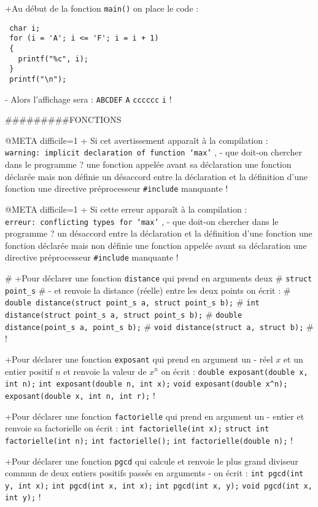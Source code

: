 +Au début de la fonction \verb|main()| on place le code :
 \begin{verbatim}
 char i;
 for (i = 'A'; i <= 'F'; i = i + 1)
 {
   printf("%c", i);
 }
 printf("\n");
\end{verbatim}
- Alors l'affichage sera :
 \verb|ABCDEF|
 \verb|A|
 \verb|cccccc|
 \verb|i|
!



#########FONCTIONS

@META difficile=1
+ Si cet avertissement apparaît à la compilation : \\
 \verb+warning: implicit declaration of function ‘max’+ , 
- que doit-on chercher dans le programme ?
  une fonction appelée avant sa déclaration
  une fonction déclarée mais non définie
  un désaccord entre la déclaration et la définition d'une fonction
  une directive préprocesseur \verb+#include+ manquante
!

@META difficile=1
+ Si cette erreur apparaît à la compilation : \\
  \verb+erreur: conflicting types for ‘max’+ , 
- que doit-on chercher dans le programme ?
  un désaccord entre la déclaration et la définition d'une fonction
  une fonction déclarée mais non définie
  une fonction appelée avant sa déclaration
  une directive préprocesseur \verb+#include+ manquante
!


# +Pour déclarer une fonction \verb|distance| qui prend en arguments deux
# \verb|struct point_s|
# - et renvoie la distance (réelle) entre les deux points on écrit :
#  \verb|double distance(struct point_s a, struct point_s b);|
#  \verb|int distance(struct point_s a, struct point_s b);|
#  \verb|double distance(point_s a, point_s b);|
#  \verb|void distance(struct a, struct b);|
# !

+Pour déclarer une fonction \verb|exposant| qui prend en argument un
- réel $x$ et un entier positif $n$ et renvoie la valeur de $x^n$ on écrit :
 \verb|double exposant(double x, int n);|
 \verb|int exposant(double n, int x);|
 \verb|void exposant(double x^n);|
 \verb|exposant(double x, int n, int r);|
!

+Pour déclarer une fonction \verb|factorielle| qui prend en argument un
- entier et renvoie sa factorielle on écrit :
 \verb|int factorielle(int x);|
 \verb|struct int factorielle(int n);|
 \verb|int factorielle();|
 \verb|int factorielle(double n);|
!

+Pour déclarer une fonction \verb|pgcd| qui calcule et renvoie le plus
  grand diviseur commun de deux entiers positifs passés en arguments 
- on écrit : 
 \verb|int pgcd(int y, int x);|
 \verb|int pgcd(int x, int x);|
 \verb|int pgcd(int x, y);|
 \verb|void pgcd(int x, int y);|
!

